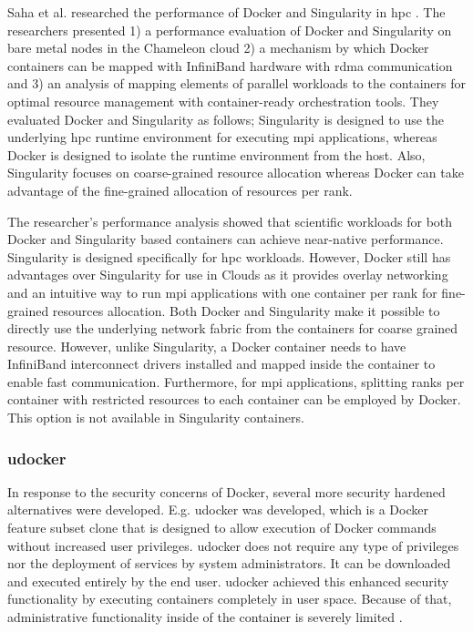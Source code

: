 \documentclass[12pt]{article}
\begin{document}
Saha et al. researched the performance of Docker and Singularity in \gls{hpc} \cite{saha2018evaluation}. The researchers presented 1) a performance evaluation of Docker and Singularity on bare metal nodes in the Chameleon cloud 2) a mechanism by which Docker containers can be mapped with InfiniBand hardware with \gls{rdma} communication and 3) an analysis of mapping elements of parallel workloads to the containers for optimal resource management with container-ready orchestration tools. They evaluated Docker and Singularity as follows; Singularity is designed to use the underlying \gls{hpc} runtime environment for executing \gls{mpi} applications, whereas Docker is designed to isolate the runtime environment from the host. Also, Singularity focuses on coarse-grained resource allocation whereas Docker can take advantage of the fine-grained allocation of resources per rank.

The researcher's performance analysis showed that scientific workloads for both Docker and Singularity based containers can achieve near-native performance. Singularity is designed specifically for \gls{hpc} workloads. However, Docker still has advantages over Singularity for use in Clouds as it provides overlay networking and an intuitive way to run \gls{mpi} applications with one container per rank for fine-grained resources allocation. Both Docker and Singularity make it possible to directly use the underlying network fabric from the containers for coarse grained resource. However, unlike Singularity, a Docker container needs to have InfiniBand interconnect drivers installed and mapped inside the container to enable fast communication. Furthermore, for \gls{mpi} applications, splitting ranks per container with restricted resources to each container can be employed by Docker. This option is not available in Singularity containers.


\subsubsection{udocker}
In response to the security concerns of Docker, several more security hardened alternatives were developed. E.g. udocker was developed, which is a Docker feature subset clone that is designed to allow execution of Docker commands without increased user privileges. udocker does not require any type of privileges nor the deployment of services by system administrators. It can be downloaded and executed entirely by the end user. udocker achieved this enhanced security functionality by executing containers completely in user space. Because of that, administrative functionality inside of the container is severely limited \cite{utah-udocker}.
\end{document}

